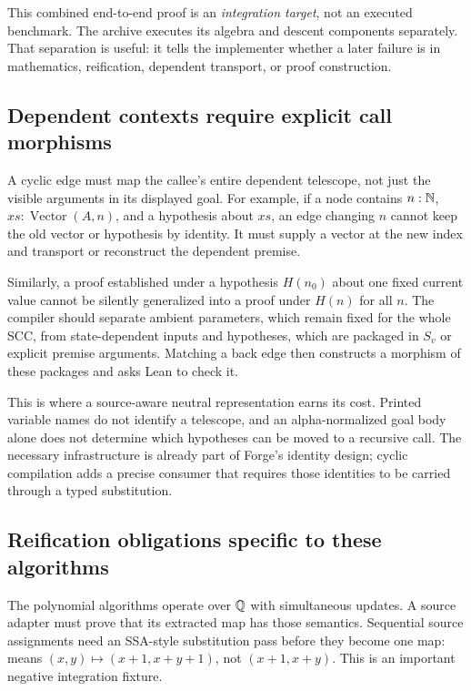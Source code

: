 This combined end-to-end proof is an \emph{integration target}, not an executed
benchmark. The archive executes its algebra and descent components separately.
That separation is useful: it tells the implementer whether a later failure is
in mathematics, reification, dependent transport, or proof construction.

\subsection{Dependent contexts require explicit call morphisms}

A cyclic edge must map the callee's entire dependent telescope, not just the
visible arguments in its displayed goal. For example, if a node contains
$n:\mathbb{N}$, $xs:\operatorname{Vector}(A,n)$, and a hypothesis about $xs$, an edge
changing $n$ cannot keep the old vector or hypothesis by identity. It must supply
a vector at the new index and transport or reconstruct the dependent premise.

Similarly, a proof established under a hypothesis $H(n_0)$ about one fixed
current value cannot be silently generalized into a proof under $H(n)$ for all
$n$. The compiler should separate ambient parameters, which remain fixed for the
whole SCC, from state-dependent inputs and hypotheses, which are packaged in
$S_v$ or explicit premise arguments. Matching a back edge then constructs a
morphism of these packages and asks Lean to check it.

This is where a source-aware neutral representation earns its cost. Printed
variable names do not identify a telescope, and an alpha-normalized goal body
alone does not determine which hypotheses can be moved to a recursive call.
The necessary infrastructure is already part of Forge's identity design;
cyclic compilation adds a precise consumer that requires those identities to be
carried through a typed substitution.

\subsection{Reification obligations specific to these algorithms}

The polynomial algorithms operate over $\mathbb{Q}$ with simultaneous updates. A source
adapter must prove that its extracted map has those semantics. Sequential source
assignments need an SSA-style substitution pass before they become one map:
 means $(x,y)\mapsto(x+1,x+y+1)$, not
$(x+1,x+y)$. This is an important negative integration fixture.

